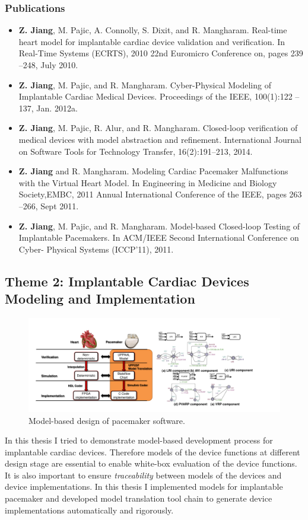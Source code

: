 \documentclass[a4paper]{article}
\begin{document}
\subsubsection{Publications} 
\begin{itemize}
\item \textbf{Z. Jiang}, M. Pajic, A. Connolly, S. Dixit, and R. Mangharam. Real-time heart model
for implantable cardiac device validation and verification. In Real-Time Systems
(ECRTS), 2010 22nd Euromicro Conference on, pages 239 –248, July 2010.
\item \textbf{Z. Jiang}, M. Pajic, and R. Mangharam. Cyber-Physical Modeling of Implantable
Cardiac Medical Devices. Proceedings of the IEEE, 100(1):122 –137, Jan. 2012a.
\item \textbf{Z. Jiang}, M. Pajic, R. Alur, and R. Mangharam. Closed-loop verification of medical
devices with model abstraction and refinement. International Journal on Software
Tools for Technology Transfer, 16(2):191–213, 2014.
\item \textbf{Z. Jiang} and R. Mangharam. Modeling Cardiac Pacemaker Malfunctions with the
Virtual Heart Model. In Engineering in Medicine and Biology Society,EMBC,
2011 Annual International Conference of the IEEE, pages 263 –266, Sept 2011.
\item \textbf{Z. Jiang}, M. Pajic, and R. Mangharam. Model-based Closed-loop Testing of Implantable Pacemakers. In ACM/IEEE Second International Conference on Cyber-
Physical Systems (ICCP’11), 2011.
\end{itemize}



\newpage


\subsection{Theme 2: Implantable Cardiac Devices Modeling and Implementation}
\begin{figure}[t]
	\centering
	\includegraphics[scale=0.32]{figs/mb_device.pdf}
	\caption{\small Model-based design of pacemaker software.}
	\label{fig:mb_device}
\end{figure}
In this thesis I tried to demonstrate model-based development process for implantable cardiac devices.
Therefore models of the device functions at different design stage are essential to enable white-box evaluation of the device functions.
It is also important to ensure \emph{traceability} between models of the devices and device implementations.
In this thesis I implemented models for implantable pacemaker and developed model translation tool chain to generate device implementations automatically and rigorously.
\end{document}
